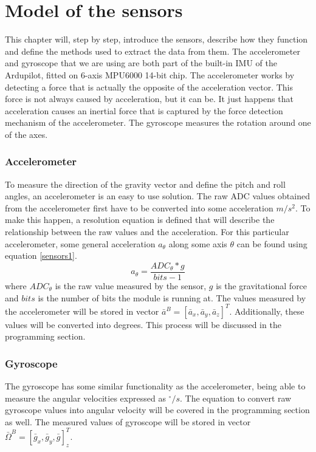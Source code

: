 \section{Model of the sensors}

This chapter will, step by step, introduce the sensors, describe how they function and define the methods used to extract the data from them. The accelerometer and gyroscope that we are using are both part of the built-in IMU of the Ardupilot, fitted on 6-axis MPU6000 14-bit chip. The accelerometer works by detecting a force that is actually the opposite of the acceleration vector. This force is not always caused by acceleration, but it can be. It just happens that acceleration causes an inertial force that is captured by the force detection mechanism of the accelerometer. The gyroscope measures the rotation around one of the axes.

\subsubsection{Accelerometer}

To measure the direction of the gravity vector and define the pitch and roll angles, an accelerometer is an easy to use solution.
The raw ADC values obtained from the accelerometer first have to be converted into some acceleration $m/s^2$. To make this happen, a resolution equation is defined that will describe the relationship between the raw values and the acceleration.
For this particular accelerometer, some general acceleration $a_\theta $ along some axis $\theta$ can be found using equation \ref{sensors1}.
\begin{equation}
\label{sensors1}	
 	a_\theta = \frac{ADC_\theta * g}{bits-1}
\end{equation}
where $ADC_\theta $ is the raw value measured by the sensor, $g$ is the gravitational force and $bits$ is the number of bits the module is running at.
The values measured by the accelerometer will be stored in vector $\bar{a}^B = [\bar{a}_x, \bar{a}_y, \bar{a}_z]^T$. Additionally, these values will be converted into degrees. This process will be discussed in the programming section.

\subsubsection{Gyroscope}

The gyroscope has some similar functionality as the accelerometer, being able to measure the angular velocities expressed as $^{\circ}/s$. The equation to convert raw gyroscope values into angular velocity will be covered in the programming section as well. The measured values of gyroscope will be stored in vector $\bar{\Omega}^B = [\bar{g}_x, \bar{g}_y, \bar{g}]_z^T$.

